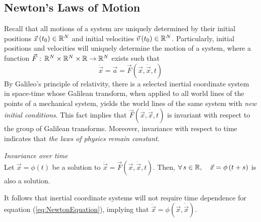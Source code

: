 \documentclass{article}
\begin{document}
		\subsection{Newton's Laws of Motion}
		Recall that all motions of a system are uniquely determined by their initial positions $\vec{x} \left(t_0\right) \in \mathbb{R}^N$ and initial velocities $\vec{v} \left(t_0\right) \in \mathbb{R}^N $. Particularly, initial positions and velocities will uniquely determine the motion of a system, where a function $\vec{F}: \, \mathbb{R}^N \times \mathbb{R}^N \times \mathbb{R} \to \mathbb{R}^N$ exists such that
		\begin{equation}
			\label{eq:NewtonEquation}
			\boxed{\ddot{\vec{x}} = \vec{a} = \vec{F} \left(\vec{x}, \dot{\vec{x}}, t \right)}
		\end{equation}
		By Galileo's principle of relativity, there is a selected inertial coordinate system in space-time whose Galilean transform, when applied to all world lines of the points of a mechanical system, yields the world lines of the same system with \textit{new initial conditions}. This fact implies that $\vec{F}\left(\vec{x}, \dot{\vec{x}}, t\right)$ is invariant with respect to the group of Galilean transforms. Moreover, invariance with respect to time indicates that \textit{the laws of physics remain constant}. 
		\begin{exmp} \textit{Invariance over time} \\
			Let $\vec{x} = \phi (t)$ be a solution to $\ddot{\vec{x}} = \vec{F} \left(\vec{x}, \dot{\vec{x}}, t \right)$. Then, $\forall \, s \in \mathbb{R}, \quad \vec{x} = \phi \left(t+s\right)$ is also a solution.
		\end{exmp}
		It follows that inertial coordinate systems will not require time dependence for equation (\ref{eq:NewtonEquation}), implying that $\ddot{\vec{x}} = \phi \left(\vec{x}, \dot{\vec{x}}\right)$.
\end{document}

